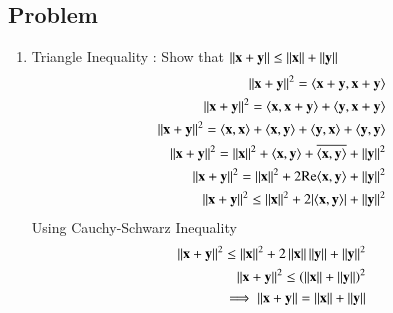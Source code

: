 \subsection{Problem}
\newcommand{\RE}{\mathrm{Re}}
\renewcommand{\theequation}{\theenumi}
\begin{enumerate}[label=\thesection.\arabic*.,ref=\thesection.\theenumi]
	\item Triangle Inequality : Show that $\left\lVert\mathbf{\mathbf{x}+\mathbf{y}}\right\rVert\leq\left\lVert\mathbf{x}\right\rVert+\left\lVert\mathbf{y}\right\rVert$\\
	\solution
\begin{align}\norm{\vec{x}+\vec{y}}^2 = \langle \vec{x}+\vec{y} , \vec{x}+\vec{y} \rangle
\\
\norm{\vec{x}+\vec{y}}^2 = \langle \vec{x} , \vec{x}+\vec{y} \rangle + \langle \vec{y} , \vec{x}+\vec{y} \rangle\\
\norm{\vec{x}+\vec{y}}^2 = \langle \vec{x} , \vec{x} \rangle + \langle \vec{x} , \vec{y} \rangle + \langle \vec{y} , \vec{x} \rangle + \langle \vec{y} , \vec{y} \rangle\\
\norm{\vec{x}+\vec{y}}^2 = \norm{\vec{x}}^2 + \langle \vec{x} , \vec{y} \rangle + \overline{\langle \vec{x} , \vec{y} \rangle} + \norm{\vec{y}}^2\\
\norm{\vec{x}+\vec{y}}^2 = \norm{\vec{x}}^2 + 2\RE{\langle \vec{x} , \vec{y} \rangle} + \norm{\vec{y}}^2\\
\norm{\vec{x}+\vec{y}}^2 \leq \norm{\vec{x}}^2 + 2|\langle \vec{x} , \vec{y} \rangle| + \norm{\vec{y}}^2
\end{align}
Using Cauchy-Schwarz Inequality
\begin{align}
\left\lVert\mathbf{x}+\mathbf{y}\right\rVert^2 \leq \left\lVert\mathbf{x}\right\rVert^2 + 2\left\lVert\mathbf{x}\right\rVert\left\lVert\mathbf{y}\right\rVert  + \left\lVert\mathbf{y}\right\rVert^2
\\
\left\lVert\mathbf{x}+\mathbf{y}\right\rVert^2 \leq \left(\left\lVert\mathbf{x}\right\rVert + \left\lVert\mathbf{y}\right\rVert\right)^2
\\
\implies \left\lVert\mathbf{x}+\mathbf{y}\right\rVert = \left\lVert\mathbf{x}\right\rVert + \left\lVert\mathbf{y}\right\rVert
\end{align}
\end{enumerate}
